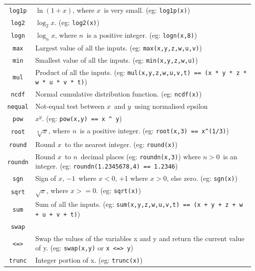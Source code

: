 \documentclass{book}
\def\lthtmlcheckvsize{\ifdim\ht\sizebox<\vsize 
  \ifdim\wd\sizebox<\hsize\expandafter\hfill\fi \expandafter\vfill
  \else\expandafter\vss\fi}%
\begin{document}
{\begin{tabular}{|c|p{}|}
\verb'log1p'& $\ln (1+x)$, where $x$\  is very small. (eg: \verb'log1p(x)')\\
\verb'log2'& $\log_2x$.  (eg: \verb'log2(x)')\\
\verb'logn'& $\log_nx$, where $n$\  is a positive integer. (eg: \verb'logn(x,8)')\\
\verb'max'& Largest value of all the inputs. (eg: \verb'max(x,y,z,w,u,v)')\\
\verb'min'& Smallest value of all the inputs. (eg: \verb'min(x,y,z,w,u)')\\
\verb'mul'& Product of all the inputs. (eg: \verb'mul(x,y,z,w,u,v,t) == (x * y * z * w * u * v * t)') \\
\verb'ncdf'& Normal cumulative distribution function.  (eg: \verb'ncdf(x)')\\
\verb'nequal'& Not-equal test between $x$\  and $y$\  using normalised epsilon\\
\verb'pow'& $x^y$.  (eg: \verb'pow(x,y) == x ^ y')\\
\verb'root'&  $\sqrt[n]{x}$, where $n$\  is a positive integer. (eg: \verb'root(x,3) == x^(1/3)')\\
\verb'round'& Round $x$\  to the nearest integer.  (eg: \verb'round(x)')\\
\verb'roundn'& Round $x$\  to $n$\  decimal places  (eg: \verb'roundn(x,3)')
 where $n > 0$\  is an integer. (eg: \verb'roundn(1.2345678,4) == 1.2346')\\\verb'sgn'& Sign of $x$, $-1$\  where $x < 0$, +1 where $x > 0$, else zero.
 (eg: \verb'sgn(x)')\\
\verb'sqrt'& $\sqrt{x}$, where $x >= 0$.  (eg: \verb'sqrt(x)')\\
\verb'sum'& Sum of all the inputs. (eg: \verb'sum(x,y,z,w,u,v,t) == (x + y + z + w + u + v + t)')\\
\verb'swap'\\\verb'<=>'& Swap the values of the variables x and y and return the current value of y.  (eg: \verb'swap(x,y)' or \verb'x <=> y')\\
\verb'trunc'& Integer portion of x.  (eg: \verb'trunc(x)')\\
\hline
\end{tabular}%
\lthtmlfigureZ
\lthtmlcheckvsize\clearpage}
\end{document}
